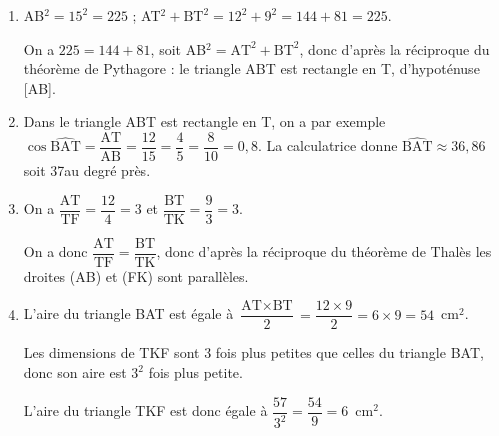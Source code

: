 \begin{enumerate}
\item AB$^2 = 15^2 = 225$ ; AT$^2 + \text{BT}^2 = 12^2 + 9^2 = 144 + 81 = 225$.

On a $225 = 144 + 81$, soit AB$^2 = \text{AT}^2 + \text{BT}^2$, donc d'après la réciproque du théorème de Pythagore : le triangle ABT est rectangle en T, d'hypoténuse [AB].
\item Dans le triangle ABT est rectangle en T, on a par exemple $\cos \widehat{\text{BAT}} = \dfrac{\text{AT}}{\text{AB}} = \dfrac{12}{15} = \dfrac{4}{5} = \dfrac{8}{10} = 0,8$. La calculatrice donne $\widehat{\text{BAT}} \approx 36,86$ soit 37\degres au degré près.
\item On a $\dfrac{\text{AT}}{\text{TF}} = \dfrac{12}{4} = 3$ et $\dfrac{\text{BT}}{\text{TK}} = \dfrac{9}{3} = 3$.

On a donc $\dfrac{\text{AT}}{\text{TF}} = \dfrac{\text{BT}}{\text{TK}}$, donc d'après la réciproque du théorème de Thalès les droites (AB) et (FK) sont parallèles.
\item L'aire du triangle BAT est égale à  $\dfrac{\text{AT} \times \text{BT}}{2} = \dfrac{12 \times 9}{2} = 6 \times 9 =  54$~cm$^2$.

Les dimensions de TKF sont 3 fois plus petites que celles du triangle BAT, donc son aire est $3^2$ fois plus petite. 

L'aire du triangle TKF est donc égale à  $\dfrac{57}{3^2} = \dfrac{54}{9} = 6$~cm$^2$.
\end{enumerate}
\bigskip
 
